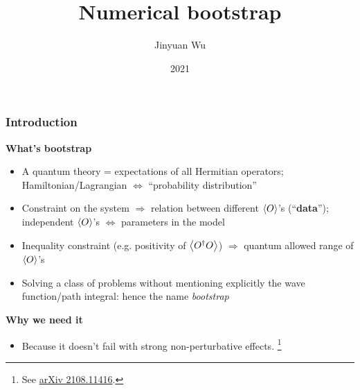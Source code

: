 \documentclass{beamer}
\title{Numerical bootstrap}
\author{Jinyuan Wu}
\institute{Department of Physics, Fudan University}
\date{2021}
\newcommand{\concept}[1]{\textbf{#1}}
\begin{document}
\frame{\titlepage}

\begin{frame}
\frametitle{Introduction}

\textbf{What's bootstrap}

\begin{itemize}
    \item A quantum theory = expectations of all Hermitian operators; 
    Hamiltonian/Lagrangian $\Leftrightarrow$ ``probability distribution''
    \item Constraint on the system $\Rightarrow$ relation between different $\expval{O}$'s (``\concept{data}'');
    independent $\expval{O}$'s $\Leftrightarrow$ parameters in the model
    \item Inequality constraint (e.g. positivity of $\expval{O^\dagger O}$) $\Rightarrow$ quantum allowed 
    range of $\expval{O}$'s
    \item Solving a class of problems without mentioning explicitly the wave function/path integral: 
    hence the name \emph{bootstrap}
\end{itemize}

\vspace{1em}

\textbf{Why we need it}

\begin{itemize}
    \item Because it doesn't fail with strong non-perturbative effects. \footnote{See \href{https://arxiv.org/abs/2108.11416}{arXiv 2108.11416}.}
\end{itemize}

\end{frame}
\end{document}
